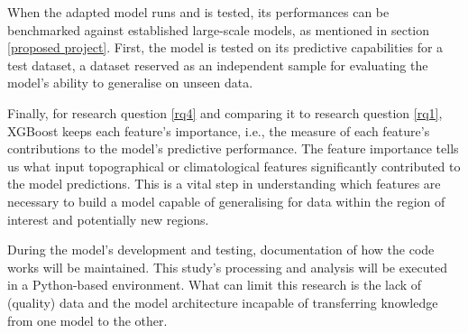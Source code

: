 When the adapted model runs and is tested, its performances can be benchmarked against established large-scale models, as mentioned in section \ref{proposed project}. First, the model is tested on its predictive capabilities for a test dataset, a dataset reserved as an independent sample for evaluating the model's ability to generalise on unseen data.

Finally, for research question \ref{rq4} and comparing it to research question \ref{rq1}, XGBoost keeps each feature's importance, i.e., the measure of each feature's contributions to the model's predictive performance. The feature importance tells us what input topographical or climatological features significantly contributed to the model predictions. This is a vital step in understanding which features are necessary to build a model capable of generalising for data within the region of interest and potentially new regions. 

During the model's development and testing, documentation of how the code works will be maintained. This study's processing and analysis will be executed in a Python-based environment. What can limit this research is the lack of (quality) data and the model architecture incapable of transferring knowledge from one model to the other.
